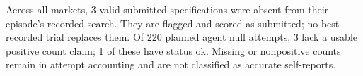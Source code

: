 Across all markets, 3 valid submitted specifications were absent from their episode's recorded search. They are flagged and scored as submitted; no best recorded trial replaces them.
Of 220 planned agent null attempts, 3 lack a usable positive count claim; 1 of these have status ok. Missing or nonpositive counts remain in attempt accounting and are not classified as accurate self-reports.
